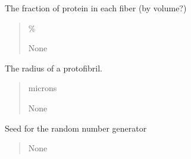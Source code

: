 \documentclass[letterpaper,10pt,english]{sphinxmanual}
\begin{document}
\begin{fulllineitems}
\begin{fulllineitems}
\end{fulllineitems}


\begin{fulllineitems}
\label{\detokenize{lysis.util:lysis.util.parameters.MicroParameters.protein_per_fiber}}
\pysigstartsignatures
{}
\pysigstopsignatures
\sphinxAtStartPar
The fraction of protein in each fiber (by volume?)
\begin{quote}\begin{description}
\sphinxAtStartPar
\%

\sphinxAtStartPar
None

\end{description}\end{quote}

\end{fulllineitems}


\begin{fulllineitems}
\label{\detokenize{lysis.util:lysis.util.parameters.MicroParameters.protofibril_radius}}
\pysigstartsignatures
{}
\pysigstopsignatures
\sphinxAtStartPar
The radius of a protofibril.
\begin{quote}\begin{description}
\sphinxAtStartPar
microns

\sphinxAtStartPar
None

\end{description}\end{quote}

\end{fulllineitems}


\begin{fulllineitems}
\label{\detokenize{lysis.util:lysis.util.parameters.MicroParameters.seed}}
\pysigstartsignatures
{}
\pysigstopsignatures
\sphinxAtStartPar
Seed for the random number generator
\begin{quote}\begin{description}
\sphinxAtStartPar
None


\end{description}
\end{quote}
\end{fulllineitems}
\end{fulllineitems}
\end{document}
